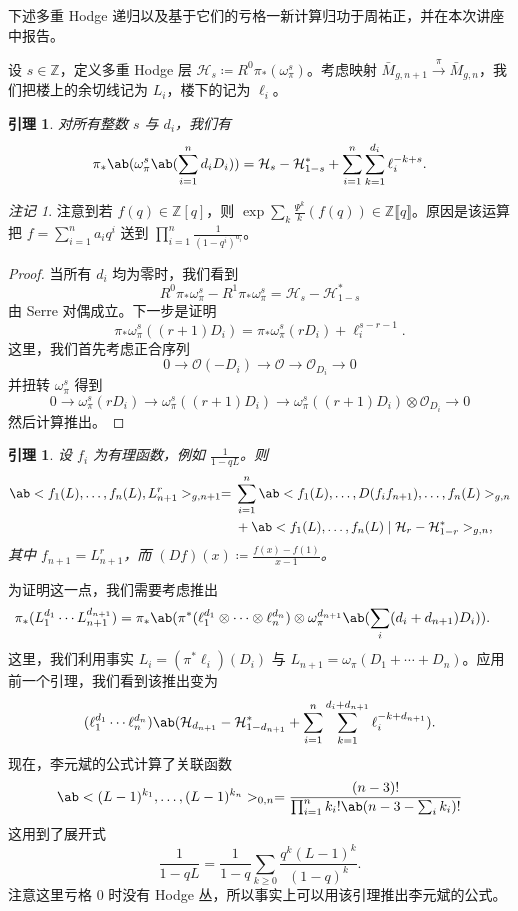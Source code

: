\documentclass{amsart}
\newtheorem{lem}[thm]{引理}
\theoremstyle{definition}
\theoremstyle{remark}
\newtheorem{rmk}[thm]{注记}
\theoremstyle{plain}
\theoremstyle{definition}
\theoremstyle{remark}
\newcommand{\Z}{\mathbb{Z}}
\newcommand{\mc}[1]{\mathcal{#1}}
\newcommand{\1}{\mathbf{1}}
\newcommand{\2}{\mathbf{2}}
\newcommand{\3}{\mathbf{3}}
\newcommand{\ps}[1]{\llbracket #1 \rrbracket}
\begin{document}
下述多重 Hodge 递归以及基于它们的亏格一新计算归功于周祐正，并在本次讲座中报告。

设 \(s \in \Z\)，定义多重 Hodge 层 \(\mc{H}_s \coloneqq R^0 \pi_* (\omega_{\pi}^s)\)。考虑映射 \(\bar{M}_{g,n+1} \xrightarrow{\pi} \bar{M}_{g,n}\)，我们把楼上的余切线记为 \(L_i\)，楼下的记为 \(\ell_i\)。

\begin{lem}
    对所有整数 \(s\) 与 \(d_i\)，我们有
    \[ \pi_*\ab(\omega_{\pi}^s\ab(\sum_{i=1}^n d_i D_i)) = \mc{H}_s-\mc{H}_{1-s}^* + \sum_{i=1}^n \sum_{k=1}^{d_i} \ell_i^{-k+s}. \]
\end{lem}

\begin{rmk}
    注意到若 \(f(q) \in \Z[q]\)，则 \(\exp \sum_k \frac{\Psi^k}{k} (f(q)) \in \Z \ps{q}\)。原因是该运算把 \(f = \sum_{i=1}^{n} a_i q^i\) 送到 \(\prod_{i=1}^n \frac{1}{(1-q^i)^{a_i}}\)。
\end{rmk}

\begin{proof}
    当所有 \(d_i\) 均为零时，我们看到
    \[ R^0 \pi_* \omega_{\pi}^s - R^1 \pi_* \omega_{\pi}^s = \mc{H}_s - \mc{H}_{1-s}^* \]
    由 Serre 对偶成立。下一步是证明
    \[ \pi_* \omega_{\pi}^s ((r+1)D_i) = \pi_* \omega_{\pi}^s(r D_i) + \ell_i^{s-r-1}. \]
    这里，我们首先考虑正合序列
    \[ 0 \to \mc{O} (-D_i) \to \mc{O} \to \mc{O}_{D_i} \to 0 \]
    并扭转 \(\omega_{\pi}^s\) 得到
    \[ 0 \to \omega_{\pi}^s(r D_i) \to \omega_{\pi}^s ((r+1)D_i) \to \omega_{\pi}^s ((r+1)D_i) \otimes \mc{O}_{D_i} \to 0 \]
    然后计算推出。
\end{proof}

\begin{lem}
    设 \(f_i\) 为有理函数，例如 \(\frac{1}{1-q L}\)。则
    \begin{align*}
        \ab<f_1(L), \ldots, f_n(L), L_{n+1}^r>_{g, n+1} ={}& \sum_{i=1}^n \ab<f_1(L), \ldots, D(f_i f_{n+1}), \ldots, f_n(L)>_{g, n} \\
        &+ \ab<f_1(L), \ldots, f_n(L) \mid \mc{H}_r - \mc{H}_{1-r}^*>_{g,n},
    \end{align*}
    其中 \(f_{n+1} = L_{n+1}^r\)，而 \((Df)(x) \coloneqq \frac{f(x)-f(1)}{x-1}\)。
\end{lem}

为证明这一点，我们需要考虑推出
\begin{align*}
    \pi_* (L_1^{d_1} \cdots L_{n+1}^{d_{n+1}}) &= \pi_* \ab(\pi^*(\ell_1^{d_1} \otimes \cdots \otimes \ell_n^{d_n}) \otimes \omega_{\pi}^{d_{n+1}}\ab(\sum_i (d_i+d_{n+1})D_i)).
\end{align*}
这里，我们利用事实 \(L_i = (\pi^* \ell_i)(D_i)\) 与 \(L_{n+1} = \omega_{\pi}(D_1 + \cdots + D_n)\)。应用前一个引理，我们看到该推出变为
\[ (\ell_1^{d_1} \cdots \ell_n^{d_n})\ab(\mc{H}_{d_{n+1}} - \mc{H}_{1-d_{n+1}}^* + \sum_{i=1}^n \sum_{k=1}^{d_i + d_{n+1}} \ell_i^{-k+d_{n+1}}). \]
现在，李元斌的公式计算了关联函数
\[ \ab<(L-1)^{k_1}, \ldots, (L-1)^{k_n}>_{0,n} = \frac{(n-3)!}{\prod_{i=1}^n k_i! \ab(n-3-\sum_i k_i)!} \]
这用到了展开式
\[ \frac{1}{1-qL} = \frac{1}{1-q} \sum_{k \geq 0} \frac{q^k(L-1)^k}{(1-q)^k}. \]
注意这里亏格 \(0\) 时没有 Hodge 丛，所以事实上可以用该引理推出李元斌的公式。
\end{document}
